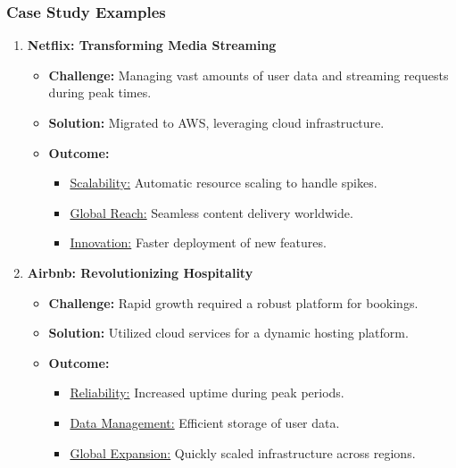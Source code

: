 \documentclass[aspectratio=169]{beamer}
\begin{document}
\begin{frame}[fragile]
    \frametitle{Case Study Examples}
    \begin{enumerate}
        \item \textbf{Netflix: Transforming Media Streaming}
        \begin{itemize}
            \item \textbf{Challenge:} Managing vast amounts of user data and streaming requests during peak times.
            \item \textbf{Solution:} Migrated to AWS, leveraging cloud infrastructure.
            \item \textbf{Outcome:}
            \begin{itemize}
                \item \underline{Scalability:} Automatic resource scaling to handle spikes.
                \item \underline{Global Reach:} Seamless content delivery worldwide.
                \item \underline{Innovation:} Faster deployment of new features.
            \end{itemize}
        \end{itemize}
        
        \item \textbf{Airbnb: Revolutionizing Hospitality}
        \begin{itemize}
            \item \textbf{Challenge:} Rapid growth required a robust platform for bookings.
            \item \textbf{Solution:} Utilized cloud services for a dynamic hosting platform.
            \item \textbf{Outcome:}
            \begin{itemize}
                \item \underline{Reliability:} Increased uptime during peak periods.
                \item \underline{Data Management:} Efficient storage of user data.
                \item \underline{Global Expansion:} Quickly scaled infrastructure across regions.
            \end{itemize}
        \end{itemize}
    \end{enumerate}
\end{frame}
\end{document}
